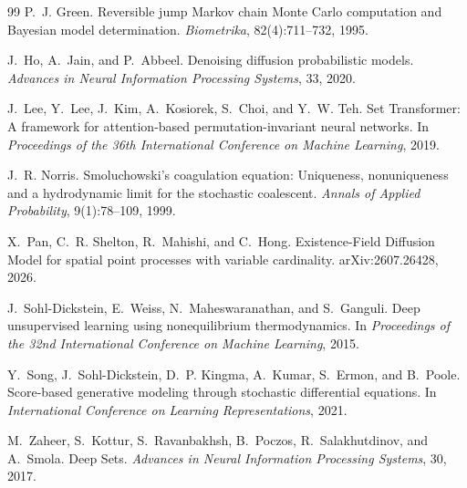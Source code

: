 \documentclass[10pt]{article}
\theoremstyle{definition}
\theoremstyle{remark}
\begin{document}
\begin{thebibliography}{99}
P.~J. Green.
\newblock Reversible jump Markov chain Monte Carlo computation and Bayesian model determination.
\newblock \emph{Biometrika}, 82(4):711--732, 1995.

J.~Ho, A.~Jain, and P.~Abbeel.
\newblock Denoising diffusion probabilistic models.
\newblock \emph{Advances in Neural Information Processing Systems}, 33, 2020.

J.~Lee, Y.~Lee, J.~Kim, A.~Kosiorek, S.~Choi, and Y.~W. Teh.
\newblock Set Transformer: A framework for attention-based permutation-invariant neural networks.
\newblock In \emph{Proceedings of the 36th International Conference on Machine Learning}, 2019.

J.~R. Norris.
\newblock Smoluchowski's coagulation equation: Uniqueness, nonuniqueness and a hydrodynamic limit for the stochastic coalescent.
\newblock \emph{Annals of Applied Probability}, 9(1):78--109, 1999.

X.~Pan, C.~R. Shelton, R.~Mahishi, and C.~Hong.
\newblock Existence-Field Diffusion Model for spatial point processes with variable cardinality.
\newblock arXiv:2607.26428, 2026.

J.~Sohl-Dickstein, E.~Weiss, N.~Maheswaranathan, and S.~Ganguli.
\newblock Deep unsupervised learning using nonequilibrium thermodynamics.
\newblock In \emph{Proceedings of the 32nd International Conference on Machine Learning}, 2015.

Y.~Song, J.~Sohl-Dickstein, D.~P. Kingma, A.~Kumar, S.~Ermon, and B.~Poole.
\newblock Score-based generative modeling through stochastic differential equations.
\newblock In \emph{International Conference on Learning Representations}, 2021.

M.~Zaheer, S.~Kottur, S.~Ravanbakhsh, B.~Poczos, R.~Salakhutdinov, and A.~Smola.
\newblock Deep Sets.
\newblock \emph{Advances in Neural Information Processing Systems}, 30, 2017.

\end{thebibliography}
\end{document}

